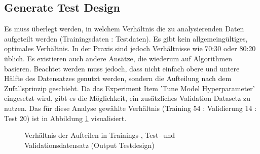 \subsection{Generate Test Design}
Es muss überlegt werden, in welchem Verhältnis die zu analysierenden Daten aufgeteilt werden (Trainingsdaten : Testdaten). Es gibt kein allgemeingültiges, optimales Verhältnis. In der Praxis sind jedoch Verhältnisse wie 70:30 oder 80:20 üblich. Es existieren auch andere Ansätze, die wiederum auf Algorithmen basieren.\citep{crowther_method_2005} Beachtet werden muss jedoch, dass nicht einfach obere und untere Hälfte des Datensatzes genutzt werden, sondern die Aufteilung nach dem Zufallsprinzip geschieht. Da das Experiment Item 'Tune Model Hyperparameter' eingesetzt wird, gibt es die Möglichkeit, ein zusätzliches Validation Datasetz zu nutzen. Das für diese Analyse gewählte Verhältnis (Training 54 : Validierung 14 : Test 20) ist in Abbildung \ref{fig:ratio} visualisiert.
\begin{figure}[H]
\centering
{}
\caption{Verhältnis der Aufteilen in Trainings-, Test- und Validationsdatensatz (Output Testdesign)}
\label{fig:ratio}
\end{figure}


